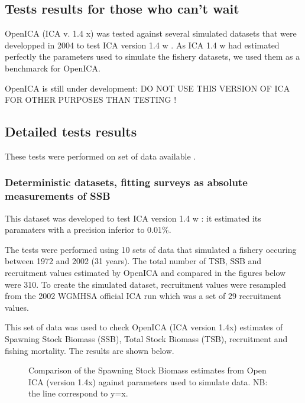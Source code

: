 \subsection{Tests results for those who can't wait}

OpenICA (ICA v. 1.4 x) was tested against several simulated datasets that were developped in 2004 to test ICA version 1.4 w \citep{kieTR05}. As ICA 1.4 w had estimated perfectly the parameters used to simulate the fishery datasets, we used them as a benchmarck for OpenICA.

OpenICA is still under development: DO NOT USE THIS VERSION OF ICA FOR OTHER PURPOSES THAN TESTING !

\subsection{Detailed tests results}

These tests were performed on set of data available .

\subsubsection{Deterministic datasets, fitting surveys as absolute measurements of SSB}

This dataset was developed to test ICA version 1.4 w \citep{kieTR05}: it estimated its paramaters with a precision inferior to 0.01\%. 

The tests were performed using 10 sets of data that simulated a fishery occuring between 1972 and 2002 (31 years). The total number of TSB, SSB and recruitment values estimated by OpenICA and compared in the figures below were 310. To create the simulated dataset, recruitment values were resampled from the 2002 WGMHSA official ICA run which was a set of 29 recruitment values.

This set of data was used to check OpenICA (ICA version 1.4x) estimates of Spawning Stock Biomass (SSB), Total Stock Biomass (TSB), recruitment and fishing mortality. The results are shown below.

\begin{figure}
	\begin{center}
	\end{center}
	\caption{Comparison of the Spawning Stock Biomass estimates from Open ICA (version 1.4x) against parameters used to simulate data. NB: the line correspond to y=x.}
\end{figure}

